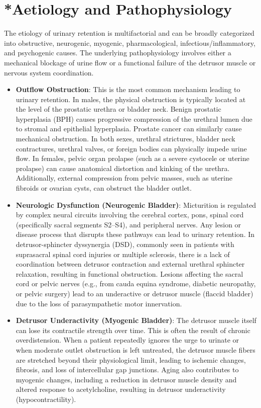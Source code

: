 \section{*{Aetiology and Pathophysiology}}
The etiology of urinary retention is multifactorial and can be broadly categorized into obstructive, neurogenic, myogenic, pharmacological, infectious/inflammatory, and psychogenic causes. The underlying pathophysiology involves either a mechanical blockage of urine flow or a functional failure of the detrusor muscle or nervous system coordination.
\begin{itemize}
    \item \textbf{Outflow Obstruction}: This is the most common mechanism leading to urinary retention. In males, the physical obstruction is typically located at the level of the prostatic urethra or bladder neck. Benign prostatic hyperplasia (BPH) causes progressive compression of the urethral lumen due to stromal and epithelial hyperplasia. Prostate cancer can similarly cause mechanical obstruction. In both sexes, urethral strictures, bladder neck contractures, urethral valves, or foreign bodies can physically impede urine flow. In females, pelvic organ prolapse (such as a severe cystocele or uterine prolapse) can cause anatomical distortion and kinking of the urethra. Additionally, external compression from pelvic masses, such as uterine fibroids or ovarian cysts, can obstruct the bladder outlet.
    \item \textbf{Neurologic Dysfunction (Neurogenic Bladder)}: Micturition is regulated by complex neural circuits involving the cerebral cortex, pons, spinal cord (specifically sacral segments S2--S4), and peripheral nerves. Any lesion or disease process that disrupts these pathways can lead to urinary retention. In detrusor-sphincter dyssynergia (DSD), commonly seen in patients with suprasacral spinal cord injuries or multiple sclerosis, there is a lack of coordination between detrusor contraction and external urethral sphincter relaxation, resulting in functional obstruction. Lesions affecting the sacral cord or pelvic nerves (e.g., from cauda equina syndrome, diabetic neuropathy, or pelvic surgery) lead to an underactive or detrusor muscle (flaccid bladder) due to the loss of parasympathetic motor innervation.
    \item \textbf{Detrusor Underactivity (Myogenic Bladder)}: The detrusor muscle itself can lose its contractile strength over time. This is often the result of chronic overdistension. When a patient repeatedly ignores the urge to urinate or when moderate outlet obstruction is left untreated, the detrusor muscle fibers are stretched beyond their physiological limit, leading to ischemic changes, fibrosis, and loss of intercellular gap junctions. Aging also contributes to myogenic changes, including a reduction in detrusor muscle density and altered response to acetylcholine, resulting in detrusor underactivity (hypocontractility).

\end{itemize}
